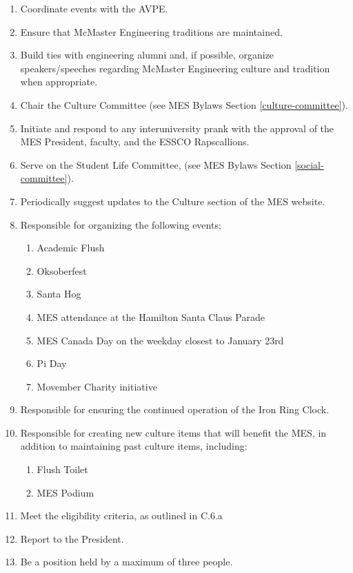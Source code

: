 \begin{enumerate}
 \item
  Coordinate events with the AVPE.
 \item
  Ensure that McMaster Engineering traditions are maintained.
 \item
  Build ties with engineering alumni and, if possible, organize speakers/speeches regarding McMaster Engineering culture and tradition when appropriate.
 \item
  Chair the Culture Committee (see MES Bylaws Section \ref{culture-committee}).
 \item
  Initiate and respond to any interuniversity prank with the approval of the MES President, faculty, and the ESSCO Rapscallions.
 \item
  Serve on the Student Life Committee, (see MES Bylaws Section \ref{social-committee}).
 \item
  Periodically suggest updates to the Culture section of the MES website.
 \item
  Responsible for organizing the following events;

  \begin{enumerate}
   \item
    Academic Flush
   \item 
    Oksoberfest
   \item
    Santa Hog
   \item
    MES attendance at the Hamilton Santa Claus Parade
   \item
    MES Canada Day on the weekday closest to January 23rd
   \item
    Pi Day
   \item
    Movember Charity initiative
  \end{enumerate}
 \item
  Responsible for ensuring the continued operation of the Iron Ring Clock.
 \item
  Responsible for creating new culture items that will benefit the MES, in addition to maintaining past culture items, including:

  \begin{enumerate}
   \item
    Flush Toilet
   \item
    MES Podium
  \end{enumerate}
 \item
  Meet the eligibility criteria, as outlined in C.6.a %
 \item
  Report to the President.
 \item
  Be a position held by a maximum of three people.

\end{enumerate}

